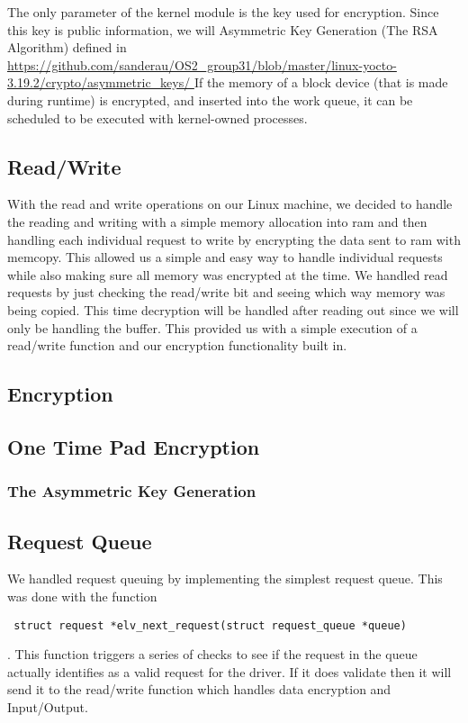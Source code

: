\documentclass[onecolumn, draftclsnofoot,10pt, compsoc]{IEEEtran}
\begin{document}
    The only parameter of the kernel module is the key used for encryption. 
    Since this key is public information, we will Asymmetric Key Generation (The RSA Algorithm) defined in \url{https://github.com/sanderau/OS2_group31/blob/master/linux-yocto-3.19.2/crypto/asymmetric_keys/ }
    If the memory of a block device (that is made during runtime) is encrypted, and inserted into the work queue, it can be scheduled to be executed with kernel-owned processes.
        
	\subsection{Read/Write}
    With the read and write operations on our Linux machine, we decided to handle the reading and writing with a simple memory allocation into ram and then handling each individual request to write by encrypting the data sent to ram with memcopy. This allowed us a simple and easy way to handle individual requests while also making sure all memory was encrypted at the time. We handled read requests by just checking the read/write bit and seeing which way memory was being copied. This time decryption will be handled after reading out since we will only be handling the buffer. This provided us with a simple execution of a read/write function and our encryption functionality built in.
    \subsection{Encryption}
    \subsection{ One Time Pad Encryption }
    \subsubsection{ The Asymmetric Key Generation }
    
    \subsection{Request Queue}
    We handled request queuing by implementing the simplest request queue. This was done with the function \begin{verbatim} struct request *elv_next_request(struct request_queue *queue) \end{verbatim}. This function triggers a series of checks to see if the request in the queue actually identifies as a valid request for the driver. If it does validate then it will send it to the read/write function which handles data encryption and Input/Output.
\end{document}
